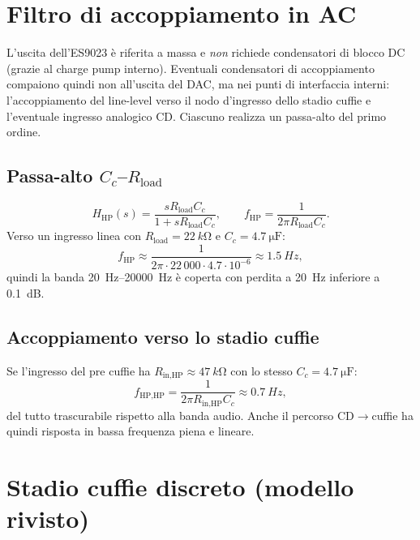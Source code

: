 \section{Filtro di accoppiamento in AC}\label{sec:accoppiamento}
L'uscita dell'ES9023 è riferita a massa e \emph{non} richiede
condensatori di blocco DC (grazie al charge pump interno). Eventuali
condensatori di accoppiamento compaiono quindi non all'uscita del DAC, ma
nei punti di interfaccia interni: l'accoppiamento del line-level verso il
nodo d'ingresso dello stadio cuffie e l'eventuale ingresso analogico CD.
Ciascuno realizza un passa-alto del primo ordine.

\subsection{Passa-alto \texorpdfstring{$C_c$--$R_{\text{load}}$}{Cc-Rload}}
\begin{equation}
  H_{\text{HP}}(s)=\frac{sR_{\text{load}}C_c}{1+sR_{\text{load}}C_c},
  \qquad f_{\text{HP}}=\frac{1}{2\pi R_{\text{load}}C_c}.
\end{equation}
Verso un ingresso linea con $R_{\text{load}}=\SI{22}{k\ohm}$ e
$C_c=\SI{4.7}{\micro\farad}$:
\begin{equation}
  f_{\text{HP}}\approx\frac{1}{2\pi\cdot22\,000\cdot4.7\cdot10^{-6}}\approx\SI{1.5}{Hz},
\end{equation}
quindi la banda \SIrange{20}{20000}{Hz} è coperta con perdita a
\SI{20}{Hz} inferiore a \SI{0.1}{dB}.

\subsection{Accoppiamento verso lo stadio cuffie}
Se l'ingresso del pre cuffie ha $R_{\text{in,HP}}\approx\SI{47}{k\ohm}$ con
lo stesso $C_c=\SI{4.7}{\micro\farad}$:
\begin{equation}
  f_{\text{HP,HP}}=\frac{1}{2\pi R_{\text{in,HP}}C_c}\approx\SI{0.7}{Hz},
\end{equation}
del tutto trascurabile rispetto alla banda audio. Anche il percorso
CD$\rightarrow$cuffie ha quindi risposta in bassa frequenza piena e
lineare.

\section{Stadio cuffie discreto (modello rivisto)}

